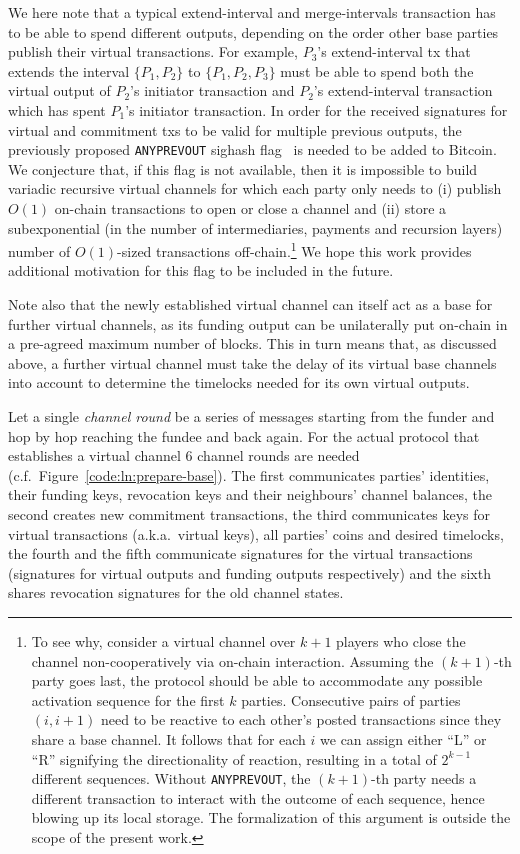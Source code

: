   We here note that a typical extend-interval and merge-intervals transaction
  has to be able to
  spend different outputs, depending on the order other base parties publish
  their virtual transactions. For example, $P_3$'s extend-interval tx that
  extends the interval $\{P_1, P_2\}$ to $\{P_1, P_2, P_3\}$ must be able to
  spend both the virtual output of $P_2$'s initiator transaction and $P_2$'s
  extend-interval transaction which has spent $P_1$'s initiator transaction.
  In order for the received signatures for virtual and commitment txs to be
  valid for multiple previous outputs, the previously proposed
  \texttt{ANYPREVOUT} sighash flag~\cite{anyprevout} is needed to be added to
  Bitcoin. We conjecture that, if this flag is not available, then it is
  impossible to build variadic recursive virtual channels for which each party
  only needs to (i) publish $O(1)$ on-chain transactions to open or close a
  channel and (ii) store a subexponential (in the number of intermediaries,
  payments and recursion layers) number of $O(1)$-sized transactions
  off-chain.\footnote{To
  see why, consider a virtual channel over $k+1$ players who close the channel
  non-cooperatively via on-chain interaction. Assuming the $(k+1)$-th party goes
  last, the protocol should be able to accommodate any possible activation
  sequence for the first $k$ parties. Consecutive pairs of parties $(i,i+1)$
  need to be reactive to each other's posted transactions since they share a
  base channel. It follows that for each $i$ we can assign either ``L'' or ``R''
  signifying the directionality of reaction, resulting in a total of $2^{k-1}$
  different sequences. Without \texttt{ANYPREVOUT}, the $(k+1)$-th party needs
  a different transaction to interact with the outcome of each sequence, hence
  blowing up its local storage. The formalization of this argument is outside
  the scope of the present work.}
  We hope this work provides additional motivation for this flag to be included
  in the future.

  Note also that the newly established virtual channel can itself act as a base
  for further virtual channels, as its funding output can be unilaterally put
  on-chain in a pre-agreed maximum number of blocks. This in turn means that, as
  discussed above, a further virtual channel must take the delay of its
  virtual base channels into account to determine the timelocks needed for its
  own virtual outputs.

  Let a single \emph{channel round} be a series of messages starting from the
  funder and hop by hop reaching the fundee and back again. For the actual
  protocol that establishes a virtual channel $6$ channel rounds are needed
  (c.f.\ Figure~\ref{code:ln:prepare-base}). The first communicates
  parties' identities, their funding keys, revocation keys and their neighbours'
  channel balances, the second creates new commitment transactions, the third
  communicates keys for virtual transactions (a.k.a.\ virtual keys), all parties'
  coins and desired timelocks, the fourth and the
  fifth communicate signatures for the virtual transactions (signatures for
  virtual outputs and funding outputs respectively) and the sixth shares
  revocation signatures for the old channel states.

